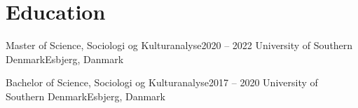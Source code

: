 \section{Education}
\mySubHeadingListStart

  \mySubHeading
    {Master of Science, Sociologi og Kulturanalyse}{2020 -- 2022}
    {University of Southern Denmark}{Esbjerg, Danmark}
    \myItemListStart
    \myItemListEnd

  \mySubHeading
    {Bachelor of Science, Sociologi og Kulturanalyse}{2017 -- 2020}
    {University of Southern Denmark}{Esbjerg, Danmark}
    \myItemListStart
    \myItemListEnd

\mySubHeadingListEnd
